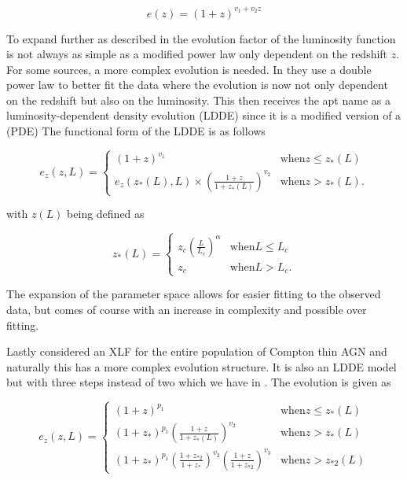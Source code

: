 $$
e(z) = (1 + z)^{v_1 +v_2 z }
$$



 To expand further as described in \cite{Silverman_2008} the evolution factor of the luminosity function is not always as simple as a modified power law only dependent on the redshift $z$.
For some sources, a more complex evolution is needed. In \cite{Silverman_2008} they use a double power law to better fit the data where 
 the evolution is now not only dependent on the redshift but also on the luminosity. This then receives the apt name as a luminosity-dependent density evolution (LDDE) since it is a modified version of a (PDE)
 The functional form of the LDDE is as follows


 \begin{equation}
    e_z(z, L) = 
    \begin{cases} 
        (1 + z)^{v_1} & \text{when} z \leq z_*(L) \\
        e_z(z_*(L), L) \times \left( \frac{1 + z}{1 + z_*(L)} \right)^{v_2} & \text{when} z >  z_*(L).
    \end{cases}
 \end{equation}

 with $z(L)$ being defined as

 \begin{equation}
    z_*(L) = 
    \begin{cases} 
        z_c \left( \frac{L}{L_c} \right)^\alpha & \text{when} L \leq L_c \\
        z_c & \text{when} L > L_c .
    \end{cases}
 \end{equation}


 The expansion of the parameter space allows for easier fitting to the observed data, but comes of course with an increase in complexity and possible over fitting. 

Lastly \cite{Ueda_2014} considered an XLF for the entire population of Compton thin AGN and naturally this has a more complex evolution structure. It is also an LDDE model but with three steps instead of two which we have in \cite{Silverman_2008}.
The evolution is given as

 
\begin{equation}
    e_z(z, L) = 
    \begin{cases} 
        (1 + z)^{p_1} & \text{when} z \leq z_*(L) \\
        (1 + z_{*})^{p_1} \left( \frac{1 + z}{1 + z_*(L)} \right)^{v_2} & \text{when} z >  z_*(L)\\
        (1 + z_{*})^{p_1} (\frac{1 + z_{*2}}{1+ z_{*}})^{v_2} (\frac{1+z}{1+z_{*2}})^{v_3} & \text{when} z >  z_{*2}(L)

    \end{cases}
\end{equation}


